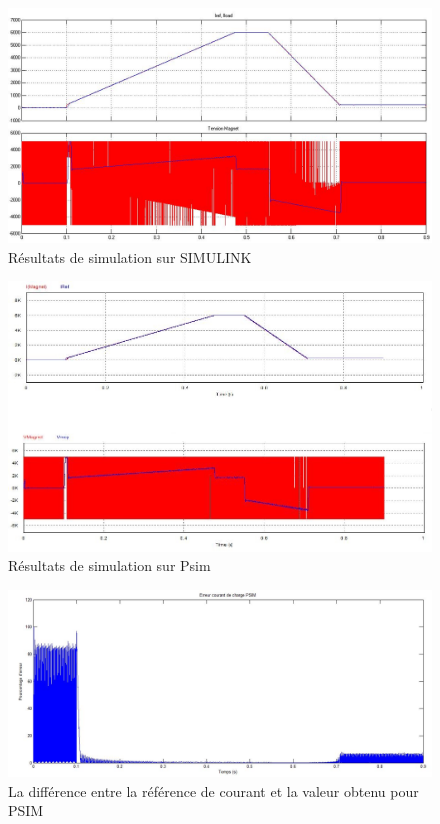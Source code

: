 \documentclass[11pt,letterpaper,final]{report}
\begin{document}
\begin{figure}[ht]
\centering
\includegraphics[scale=0.5]{fig/resul_sim.jpg}
\caption{Résultats de simulation sur SIMULINK}
\end{figure}
\begin{figure}[ht]
\centering
\includegraphics[scale=0.6]{fig/resul_psim.jpg}
\caption{Résultats de simulation sur Psim}
\end{figure}

\begin{figure}[ht]
\centering
\includegraphics[scale=0.5]{erreur_PSIM.jpg}
\caption{La différence entre la référence de courant et la valeur obtenu pour PSIM}
\end{figure}
\end{document}
